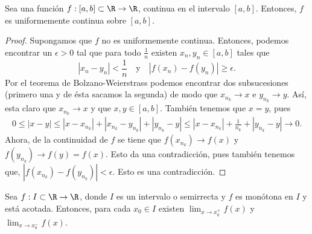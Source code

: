 \begin{ftheorem}[]
	\normalfont Sea una función $\displaystyle f : \left[a,b\right]\subset \R  \to \R $, continua en el intervalo $\displaystyle [a,b] $. Entonces, $\displaystyle f $ es uniformemente continua sobre $\displaystyle \left[a,b\right]  $.
\end{ftheorem}
\begin{proof}
	Supongamos que $\displaystyle f $ no es uniformemente continua. Entonces, podemos encontrar un $\displaystyle \epsilon > 0 $ tal que para todo $\displaystyle \frac{1}{n} $ existen $\displaystyle x_{n}, y_{n} \in [a,b] $ tales que 
	\[ \left|x_{n}-y_{n}\right| < \frac{1}{n} \quad \text{y}\quad \left|f\left(x_{n}\right)-f\left(y_{n}\right)\right| \geq \epsilon  .\]
	Por el teorema de Bolzano-Weierstrass podemos encontrar dos subsucesiones (primero una y de ésta sacamos la segunda) de modo que $\displaystyle x_{n_{k}} \to x $ e $\displaystyle y_{n_{k}} \to y $. Así, esta claro que $\displaystyle x_{n_{k}} \to x $ y que $\displaystyle x,y \in [a,b] $. También tenemos que $\displaystyle x = y $, pues
	\[
	\begin{split}
	0 \leq \left|x -y\right| \leq \left|x - x_{n_{k}}\right| + \left|x_{n_{k}}-y_{n_{k}}\right| + \left|y_{n_{k}}-y\right| \leq \left|x - x_{n_{k}}\right| + \frac{1}{n_{k}} + \left|y_{n_{k}} - y\right| \to 0 .
	\end{split}
	\]
	Ahora, de la continuidad de $\displaystyle f $ se tiene que $\displaystyle f\left(x_{n_{k}}\right) \to f\left(x\right) $ y $\displaystyle f\left(y_{n_{k}}\right)\to f\left(y\right) = f\left(x\right) $. Esto da una contradicción, pues también tenemos que, $\displaystyle \left|f\left(x_{n_{k}}\right)-f\left(y_{n_{k}}\right)\right| < \epsilon  $. Esto es una contradicción.
\end{proof}
\begin{ftheorem}[]
\normalfont Sea $\displaystyle f : I \subset \R \to \R $, donde $\displaystyle I $ es un intervalo o semirrecta y $\displaystyle f $ es monótona en $\displaystyle I $ y está acotada. Entonces, para cada $\displaystyle x_{0} \in I $ existen $\displaystyle \lim_{x \to x_{0}^{+}}f\left(x\right) $ y $\displaystyle \lim_{x \to x_{0}^{-}}f\left(x\right) $.
\end{ftheorem}
